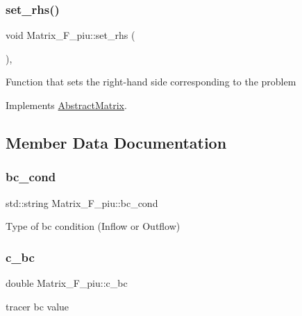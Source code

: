 \subsubsection{\texorpdfstring{set\+\_\+rhs()}{set\_rhs()}}
{\footnotesize\ttfamily void Matrix\+\_\+\+F\+\_\+piu\+::set\+\_\+rhs (\begin{DoxyParamCaption}{ }\end{DoxyParamCaption})\hspace{0.3cm}{\ttfamily [override]}, {\ttfamily [virtual]}}

Function that sets the right-\/hand side corresponding to the problem 

Implements \hyperlink{classAbstractMatrix_a1334661de25f76dc65f16538c167a03c}{Abstract\+Matrix}.



\subsection{Member Data Documentation}
\mbox{\label{classMatrix__F__piu_a21cf5eed26e8fb9e8ad570bc56b1ea68}} 
\subsubsection{\texorpdfstring{bc\+\_\+cond}{bc\_cond}}
{\footnotesize\ttfamily std\+::string Matrix\+\_\+\+F\+\_\+piu\+::bc\+\_\+cond\hspace{0.3cm}{\ttfamily [private]}}

Type of bc condition (Inflow or Outflow) \mbox{\label{classMatrix__F__piu_ae3b52ffd1775204d798f71cb2a764418}} 
\subsubsection{\texorpdfstring{c\+\_\+bc}{c\_bc}}
{\footnotesize\ttfamily double Matrix\+\_\+\+F\+\_\+piu\+::c\+\_\+bc\hspace{0.3cm}{\ttfamily [private]}}

tracer bc value \mbox{\label{classMatrix__F__piu_add146b5bb9b16e37ca9fbd3727c5ebe3}} 
